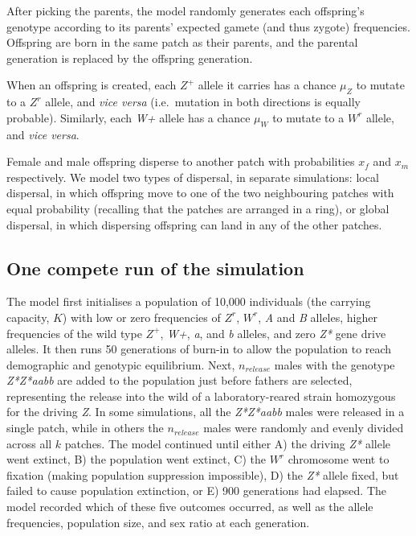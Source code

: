 \documentclass[]{rsos}%
\begin{document}
After picking the parents, the model randomly generates each offspring's
genotype according to its parents' expected gamete (and thus zygote)
frequencies. Offspring are born in the same patch as their parents, and
the parental generation is replaced by the offspring generation.

When an offspring is created, each \(Z^+\) allele it carries has a
chance \(\mu_Z\) to mutate to a \(Z^r\) allele, and \emph{vice versa}
(i.e.~mutation in both directions is equally probable). Similarly, each
\emph{W+} allele has a chance \(\mu_W\) to mutate to a \(W^r\) allele,
and \emph{vice versa}.

Female and male offspring disperse to another patch with probabilities
\(x_f\) and \(x_m\) respectively. We model two types of dispersal, in
separate simulations: local dispersal, in which offspring move to one of
the two neighbouring patches with equal probability (recalling that the
patches are arranged in a ring), or global dispersal, in which
dispersing offspring can land in any of the other patches.

\hypertarget{one-compete-run-of-the-simulation}{%
\subsection{One compete run of the
simulation}\label{one-compete-run-of-the-simulation}}

The model first initialises a population of 10,000 individuals (the
carrying capacity, \(K\)) with low or zero frequencies of \(Z^r\),
\(W^r\), \emph{A} and \emph{B} alleles, higher frequencies of the wild
type \(Z^+\), \emph{W+}, \emph{a}, and \emph{b} alleles, and zero
\emph{Z*} gene drive alleles. It then runs 50 generations of burn-in to
allow the population to reach demographic and genotypic equilibrium.
Next, \(n_{release}\) males with the genotype \emph{Z*Z*aabb} are added
to the population just before fathers are selected, representing the
release into the wild of a laboratory-reared strain homozygous for the
driving \emph{Z}. In some simulations, all the \emph{Z*Z*aabb} males
were released in a single patch, while in others the \(n_{release}\)
males were randomly and evenly divided across all \(k\) patches. The
model continued until either A) the driving \emph{Z*} allele went
extinct, B) the population went extinct, C) the \(W^r\) chromosome went
to fixation (making population suppression impossible), D) the \emph{Z*}
allele fixed, but failed to cause population extinction, or E) 900
generations had elapsed. The model recorded which of these five outcomes
occurred, as well as the allele frequencies, population size, and sex
ratio at each generation.
\end{document}
